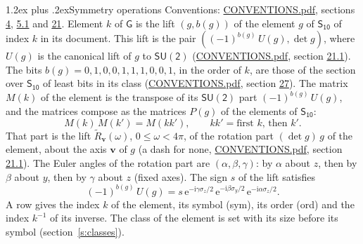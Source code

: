 \documentclass[10pt,a4paper]{article}
\makeatletter
\renewcommand\section{\@startsection{section}{1}{\z@}{-3ex plus -1ex minus -.2ex}%
  {1.2ex plus .2ex}{\normalfont\large\sffamily\bfseries\color{parttitle}}}
\numberwithin{equation}{section}
\newcommand{\grp}[1]{\mathsf{#1}}
\newcommand{\vv}{\mathbf{v}}
\newcommand{\iunit}{\mathrm{i}}
\newcommand{\expe}{\mathrm{e}}
\newcommand{\lift}[1]{\tilde{#1}}
\newcommand{\pauli}[1]{\sigma_{#1}}
\makeatother
\begin{document}
\section{Symmetry operations}\label{s:elements}
Conventions: \href{../../CONVENTIONS.pdf}{CONVENTIONS.pdf}, sections \href{../../../rotation/CONVENTIONS.pdf\#conv.4}{4}, \href{../../../rotation/CONVENTIONS.pdf\#conv.5.1}{5.1} and \href{../../CONVENTIONS.pdf\#conv.21}{21}.
\leavevmode\label{n:index.element}\label{n:element.g}\label{n:function.section}Element $k$ of $\grp{G}$ is the lift $(g, b(g))$ of the element $g$ of \href{../../../rotation/data/pdf/S10.pdf}{$\grp{S_{10}}$} of index $k$ in its document. This lift is the pair $((-1)^{b(g)}\,U(g), \det g)$, where $U(g)$ is the canonical lift of $g$ to $\grp{SU(2)}$ (\href{../../CONVENTIONS.pdf}{CONVENTIONS.pdf}, section \href{../../CONVENTIONS.pdf\#conv.21.1}{21.1}). The bits $b(g) = 0, 1, 0, 0, 1, 1, 1, 0, 0, 1$, in the order of $k$, are those of the section over $\grp{S_{10}}$ of least bits in its class (\href{../../CONVENTIONS.pdf}{CONVENTIONS.pdf}, section \href{../../CONVENTIONS.pdf\#conv.27}{27}). \label{n:matrix.element.pin}\label{n:matrix.element}The matrix $M(k)$ of the element is the transpose of its $\grp{SU(2)}$ part $(-1)^{b(g)}\,U(g)$, and the matrices compose as the matrices $P(g)$ of the elements of $\grp{S_{10}}$:
\begin{equation}\label{e:mprod}M(k)\,M(k') = M(kk'),\qquad kk' = \text{first } k\text{, then } k'.\end{equation}
\leavevmode\label{n:angle.omega}\label{n:vector.axis}\label{n:vector.pole}That part is the lift $\lift{R}_{\vv}(\omega)$, $0 \le \omega < 4\pi$, of the rotation part $(\det g)\,g$ of the element, about the axis $\vv$ of $g$ (a dash for none, \href{../../CONVENTIONS.pdf}{CONVENTIONS.pdf}, section \href{../../CONVENTIONS.pdf\#conv.21.1}{21.1}). \label{n:angle.euler.alpha}\label{n:angle.euler.beta}\label{n:angle.euler.gamma}\label{n:vector.coordinates}The Euler angles of the rotation part are $(\alpha,\beta,\gamma)$: by $\alpha$ about $z$, then by $\beta$ about $y$, then by $\gamma$ about $z$ (fixed axes). \label{n:local.euler.sign}The sign $s$ of the lift satisfies
\begin{equation}\label{e:euler}(-1)^{b(g)}\,U(g) = s\,\expe^{-\iunit\gamma\pauli{z}/2}\,\expe^{-\iunit\beta\pauli{y}/2}\,\expe^{-\iunit\alpha\pauli{z}/2}.\end{equation}
\leavevmode\label{n:index.element.inverse}\label{n:head.sym}\label{n:head.ord}A row gives the index $k$ of the element, its symbol (sym), its order (ord) and the index $k^{-1}$ of its inverse. \label{n:head.class}The class of the element is set with its size before its symbol (section~\ref{s:classes}).
\end{document}
